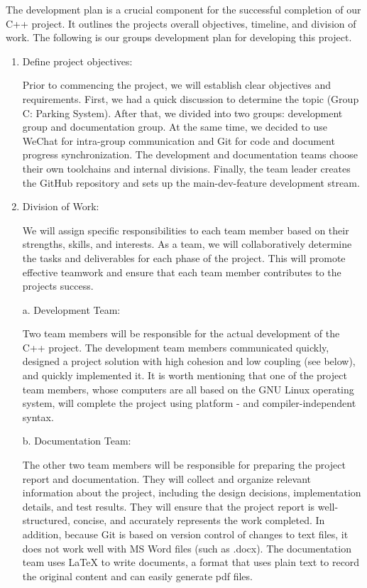 {The development plan is a crucial component for the successful
completion of our C++ project. It outlines the project\textquotesingle s
overall objectives, timeline, and division of work. The following is our
group\textquotesingle s development plan for developing this project.

\begin{enumerate}
\def\labelenumi{\arabic{enumi}.}
\item
  Define project objectives:

  Prior to commencing the project, we will establish clear objectives
  and requirements. First, we had a quick discussion to determine the
  topic (Group C: Parking System). After that, we divided into two
  groups: development group and documentation group. At the same time,
  we decided to use WeChat for intra-group communication and Git for
  code and document progress synchronization. The development and
  documentation teams choose their own toolchains and internal
  divisions. Finally, the team leader creates the GitHub repository and
  sets up the main-dev-feature development stream.
\item
  Division of Work:

  We will assign specific responsibilities to each team member based on
  their strengths, skills, and interests. As a team, we will
  collaboratively determine the tasks and deliverables for each phase of
  the project. This will promote effective teamwork and ensure that each
  team member contributes to the project\textquotesingle s success.

  a. Development Team:

  Two team members will be responsible for the actual development of the
  C++ project. The development team members communicated quickly,
  designed a project solution with high cohesion and low coupling (see
  below), and quickly implemented it. It is worth mentioning that one of
  the project team members, whose computers are all based on the GNU
  Linux operating system, will complete the project using platform - and
  compiler-independent syntax.

  b. Documentation Team:

  The other two team members will be responsible for preparing the
  project report and documentation. They will collect and organize
  relevant information about the project, including the design
  decisions, implementation details, and test results. They will ensure
  that the project report is well-structured, concise, and accurately
  represents the work completed. In addition, because Git is based on
  version control of changes to text files, it does not work well with
  MS Word files (such as .docx). The documentation team uses \LaTeX
  to write documents, a format that uses plain text to record the
  original content and can easily generate pdf files.
\end{enumerate}

}
